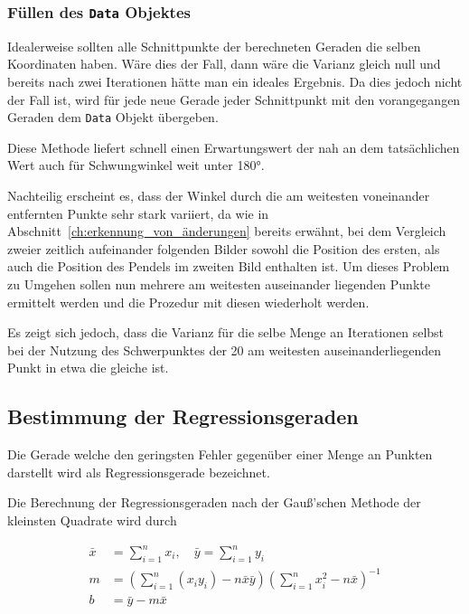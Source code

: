 \subsubsection{Füllen des \lstinline{Data} Objektes}

Idealerweise sollten alle Schnittpunkte der berechneten Geraden die selben Koordinaten haben.
Wäre dies der Fall, dann wäre die Varianz gleich null und bereits nach zwei Iterationen hätte man ein ideales Ergebnis.
Da dies jedoch nicht der Fall ist, wird für jede neue Gerade jeder Schnittpunkt mit den vorangegangen Geraden dem \lstinline{Data} Objekt übergeben.

Diese Methode liefert schnell einen Erwartungswert der nah an dem tatsächlichen Wert auch für Schwungwinkel weit unter 180°.

Nachteilig erscheint es, dass der Winkel durch die am weitesten voneinander entfernten Punkte sehr stark variiert, da wie in Abschnitt~\ref{ch:erkennung_von_änderungen} bereits erwähnt, bei dem Vergleich zweier zeitlich aufeinander folgenden Bilder sowohl die Position des ersten, als auch die Position des Pendels im zweiten Bild enthalten ist.
Um dieses Problem zu Umgehen sollen nun mehrere am weitesten auseinander liegenden Punkte ermittelt werden und die Prozedur mit diesen wiederholt werden.

Es zeigt sich jedoch, dass die Varianz für die selbe Menge an Iterationen selbst bei der Nutzung des Schwerpunktes der 20 am weitesten auseinanderliegenden Punkt in etwa die gleiche ist.


\subsection{Bestimmung der Regressionsgeraden}

Die Gerade welche den geringsten Fehler gegenüber einer Menge an Punkten darstellt wird als Regressionsgerade bezeichnet.

Die Berechnung der Regressionsgeraden nach der Gauß'schen Methode der kleinsten Quadrate wird durch %

\begin{equation}
    \begin{split}
    \bar{x} &= \sum_{i=1}^n x_i, \quad \bar{y} = \sum_{i=1}^n y_i \\
    m &= \left(\sum_{i=1}^n (x_i y_i) - n \bar{x} \bar{y}\right) \left(\sum_{i=1}^n x_i^2 - n \bar{x}\right)^{-1} \\
    b &= \bar{y} - m\bar{x}
    \end{split}
    \label{eq:regression_gauss}
\end{equation}

